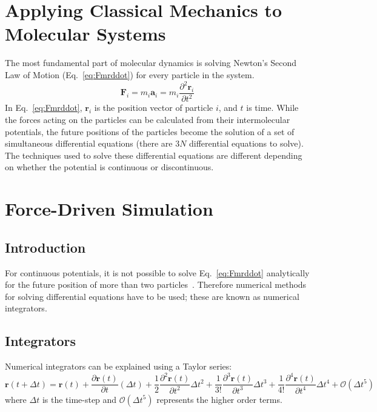 \documentclass[12pt]{UoAthesis} \usepackage{booktabs}
\begin{document}
\section{Applying Classical Mechanics to Molecular Systems}

The most fundamental part of molecular dynamics is solving Newton's
Second Law of Motion (Eq.~\eqref{eq:Fmrddot}) for every particle in
the system.
\begin{equation} 
  \mathbf{F}_i = m_i \mathbf{a}_i = m_i \frac{\partial^2 \mathbf{r}_i}{\partial t^2}
  \label{eq:Fmrddot} 
\end{equation}
In Eq.~\eqref{eq:Fmrddot}, $\mathbf{r}_i$
is the position vector of particle $i$, and $t$ is time.  While the
forces acting on the particles can be calculated from their
intermolecular potentials, the future positions of the particles
become the solution of a set of simultaneous differential equations
(there are $3N$ differential equations to solve).  The techniques used
to solve these differential equations are different depending on
whether the potential is continuous or discontinuous.

\section{Force-Driven Simulation}
\subsection{Introduction}
For continuous potentials, it is not possible to solve
Eq.~\eqref{eq:Fmrddot} analytically for the future position of more
than two particles~\cite{Poschel2005}.  Therefore numerical methods
for solving differential equations have to be used; these are known as
numerical integrators.

\subsection{Integrators}
\label{sec:Integrator} 
Numerical integrators can be explained using a Taylor series:
\begin{equation} 
\mathbf{r}(t+\Delta t) = \mathbf{r}(t) + 
\frac{\partial\mathbf{r}(t)}{\partial t}(\Delta t) + 
\frac{1}{2}\frac{\partial^2\mathbf{r}(t)}{\partial t^2}\Delta t^2 + 
\frac{1}{3!}\frac{\partial^3\mathbf{r}(t)}{\partial t^3}\Delta t^3 
+ \frac{1}{4!}\frac{\partial^4\mathbf{r}(t)}{\partial t^4}\Delta t^4 
+ \mathcal{O}(\Delta t^5) \label{eq:Taylor} 
\end{equation}
where $\Delta t$ is the time-step and $\mathcal{O}(\Delta t^5)$
represents the higher order terms.
\end{document}
